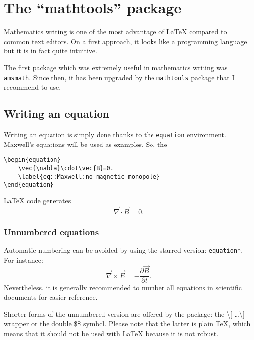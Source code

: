 

\chapter{The \enquote{mathtools} package}

Mathematics writing is one of the most advantage of \LaTeX{} compared to common text editors.
On a first approach, it looks like a programming language but it is in fact quite intuitive.

The first package which was extremely useful in mathematics writing was \texttt{amsmath}.
Since then, it has been upgraded by the \texttt{mathtools} package that I recommend to use.


\section{Writing an equation}

	Writing an equation is simply done thanks to the \texttt{equation} environment.
	Maxwell's equations will be used as examples.
	So, the 
\begin{lstlisting}[language={[LaTeX]TeX}]
\begin{equation}
	\vec{\nabla}\cdot\vec{B}=0.
	\label{eq::Maxwell:no_magnetic_monopole}
\end{equation}
\end{lstlisting}
	\LaTeX{} code generates
	\begin{equation}
		\vec{\nabla}\cdot\vec{B}=0.
		\label{eq::Maxwell:no_magnetic_monopole}
	\end{equation}
	
	
	\subsection{Unnumbered equations}
	
		Automatic numbering can be avoided by using the starred version: \texttt{equation*}.
		For instance:
		\begin{equation*}
			\vec{\nabla}\times\vec{E}=-\frac{\partial\vec{B}}{\partial t}.
		\end{equation*}
		Nevertheless, it is generally recommended to number all equations in scientific documents for easier reference.
		
		Shorter forms of the unnumbered version are offered by the package: the \textbackslash [ \ldots \textbackslash ] wrapper or the double \$\$ symbol.
		Please note that the latter is plain \TeX{}, which means that it should not be used with LaTeX because it is not robust.
		
